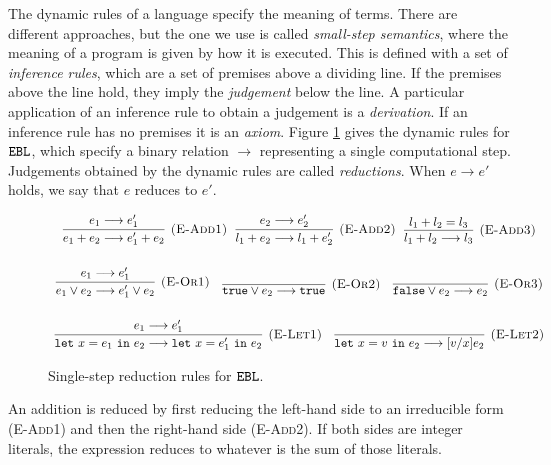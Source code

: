 The dynamic rules of a language specify the meaning of terms. There are different approaches, but the one we use is called \textit{small-step semantics}, where the meaning of a program is given by how it is executed. This is defined with a set of \textit{inference rules}, which are a set of premises above a dividing line. If the premises above the line hold, they imply the \textit{judgement} below the line. A particular application of an inference rule to obtain a judgement is a \textit{derivation}. If an inference rule has no premises it is an \textit{axiom}. Figure \ref{fig:ebl_dynamic} gives the dynamic rules for $\mathtt{EBL}$, which specify a binary relation $\longrightarrow$ representing a single computational step. Judgements obtained by the dynamic rules are called \textit{reductions}. When $e \longrightarrow e'$ holds, we say that $e$ reduces to $e'$.

\begin{figure}[h]

\noindent
{}

\[
\begin{array}{c}

\infer[\textsc{(E-Add1)}]
	{e_1 + e_2 \longrightarrow e_1' + e_2}
	{e_1 \longrightarrow e_1'}
~~
\infer[\textsc{(E-Add2)}]
	{l_1 + e_2 \longrightarrow l_1 + e_2'}
	{e_2 \longrightarrow e_2'}
~~
\infer[\textsc{(E-Add3)}]
	{l_1 + l_2 \longrightarrow l_3}
	{l_1 + l_2 = l_3} \\[4ex]

\infer[\textsc{(E-Or1)}]
	{e_1 \lor e_2 \longrightarrow e_1' \lor e_2}
	{e_1 \longrightarrow e_1'}
	~~~
\infer[\textsc{(E-Or2)}]
	{\true \lor e_2 \longrightarrow \true}
	{}
	~~~
\infer[\textsc{(E-Or3)}]
	{\false \lor e_2 \longrightarrow e_2}
	{}\\[4ex]
	
\infer[\textsc{(E-Let1)}]
	{\letxpr{x}{e_1}{e_2} \longrightarrow \letxpr{x}{e_1'}{e_2}}
	{e_1 \longrightarrow e_1'}
	~~~
\infer[\textsc{(E-Let2)}]
	{\letxpr{x}{v}{e_2} \longrightarrow [v/x]e_2}
	{}

\end{array}
\]

\vspace{-12pt}
\caption{Single-step reduction rules for $\mathtt{EBL}$.}
\label{fig:ebl_dynamic}
\end{figure}

An addition is reduced by first reducing the left-hand side to an irreducible form (\textsc{E-Add1}) and then the right-hand side (\textsc{E-Add2}). If both sides are integer literals, the expression reduces to whatever is the sum of those literals.

